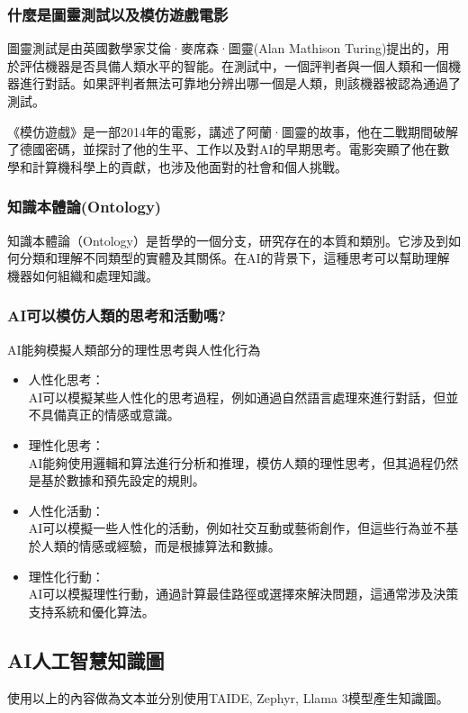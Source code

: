 \subsubsection{什麼是圖靈測試以及模仿遊戲電影}
圖靈測試是由英國數學家艾倫·麥席森·圖靈(Alan Mathison Turing)提出的，用於評估機器是否具備人類水平的智能。在測試中，一個評判者與一個人類和一個機器進行對話。如果評判者無法可靠地分辨出哪一個是人類，則該機器被認為通過了測試。\\
\par《模仿遊戲》是一部2014年的電影，講述了阿蘭·圖靈的故事，他在二戰期間破解了德國密碼，並探討了他的生平、工作以及對AI的早期思考。電影突顯了他在數學和計算機科學上的貢獻，也涉及他面對的社會和個人挑戰。
\subsubsection{知識本體論(Ontology)}
知識本體論（Ontology）是哲學的一個分支，研究存在的本質和類別。它涉及到如何分類和理解不同類型的實體及其關係。在AI的背景下，這種思考可以幫助理解機器如何組織和處理知識。
\subsubsection{AI可以模仿人類的思考和活動嗎?}
AI能夠模擬人類部分的理性思考與人性化行為
\begin{itemize}
    \item 人性化思考：\\
        AI可以模擬某些人性化的思考過程，例如通過自然語言處理來進行對話，但並不具備真正的情感或意識。
    \item 理性化思考：\\
         AI能夠使用邏輯和算法進行分析和推理，模仿人類的理性思考，但其過程仍然是基於數據和預先設定的規則。
    \item 人性化活動：\\
        AI可以模擬一些人性化的活動，例如社交互動或藝術創作，但這些行為並不基於人類的情感或經驗，而是根據算法和數據。
    \item 理性化行動：\\
        AI可以模擬理性行動，通過計算最佳路徑或選擇來解決問題，這通常涉及決策支持系統和優化算法。
\end{itemize}
\newpage

\subsection{AI人工智慧知識圖}
使用以上的內容做為文本並分別使用TAIDE, Zephyr, Llama 3模型產生知識圖。

